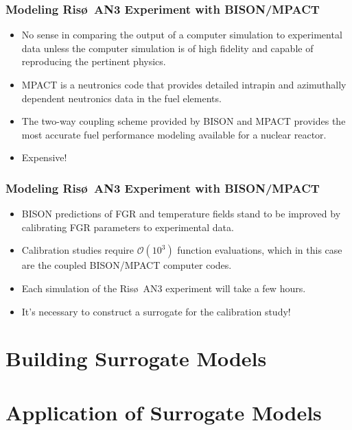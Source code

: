 \documentclass{beamer}
\begin{document}
\begin{frame}
\frametitle{Modeling Ris\o~AN3 Experiment with BISON/MPACT}

\begin{itemize}
  \item No sense in comparing the output of a computer simulation to
experimental data unless the computer simulation is of high fidelity and capable
of reproducing the pertinent physics.
  \item MPACT is a neutronics code that provides detailed intrapin and azimuthally dependent
neutronics data in the fuel elements. 
  \item The two-way coupling scheme provided by BISON and MPACT provides the most accurate fuel performance modeling available for a nuclear reactor.
  \item Expensive! 
\end{itemize}

\end{frame}
\begin{frame}
\frametitle{Modeling Ris\o~AN3 Experiment with BISON/MPACT}

\begin{itemize}
  \item BISON predictions of FGR and temperature fields stand to be improved by calibrating FGR parameters to experimental data.
  \item Calibration studies require $\mathcal{O}(10^3)$ function evaluations, which in this case are the coupled BISON/MPACT computer codes.
  \item Each simulation of the Ris\o~AN3 experiment will take a few hours.
  \item It's necessary to construct a surrogate for the calibration study!   
\end{itemize}

\end{frame}

\section{Building Surrogate Models}

\section{Application of Surrogate Models}
\end{document}
